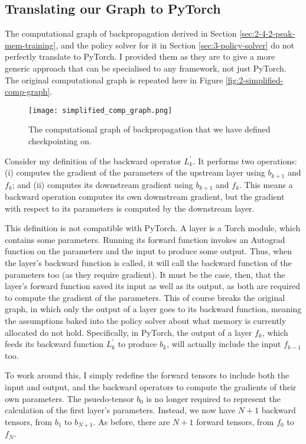 \subsection{Translating our Graph to PyTorch}
The computational graph of backpropagation derived in Section \ref{sec:2-4-2-peak-mem-training}, and the policy solver for it in Section \ref{sec:3-policy-solver} do not perfectly translate to PyTorch.
I provided them as they are to give a more generic approach that can be specialised to any framework, not just PyTorch.
The original computational graph is repeated here in Figure \ref{fig:2-simplified-comp-graph}.

\begin{figure}[h]
    \centering
    \texttt{[image: simplified\_comp\_graph.png]}
    \caption{The computational graph of backpropagation that we have defined checkpointing on.}
    \label{fig:3-simplified-comp-graph}
\end{figure}

Consider my definition of the backward operator \(L_k^\prime\).
It performs two operations: (i) computes the gradient of the parameters of the upstream layer using \(b_{k+1}\) and \(f_k\); and (ii) computes its downstream gradient using \(b_{k+1}\) and \(f_k\).
This means a backward operation computes its own downstream gradient, but the gradient with respect to its parameters is computed by the downstream layer.

This definition is not compatible with PyTorch.
A layer is a Torch module, which contains some parameters.
Running its forward function invokes an Autograd function on the parameters and the input to produce some output.
Thus, when the layer's backward function is called, it will call the backward function of the parameters too (as they require gradient).
It must be the case, then, that the layer's forward function saved its input as well as its output, as both are required to compute the gradient of the parameters.
This of course breaks the original graph, in which only the output of a layer goes to its backward function, meaning the assumptions baked into the policy solver about what memory is currently allocated do not hold.
Specifically, in PyTorch, the output of a layer \(f_k\), which feeds its backward function \(L_k^\prime\) to produce \(b_k\), will actually include the input \(f_{k-1}\) too.

To work around this, I simply redefine the forward tensors to include both the input and output, and the backward operators to compute the gradients of their own parameters.
The psuedo-tensor \(b_0\) is no longer required to represent the calculation of the first layer's parameters.
Instead, we now have \(N+1\) backward tensors, from \(b_1\) to \(b_{N+1}\).
As before, there are \(N+1\) forward tensors, from \(f_0\) to \(f_N\).

